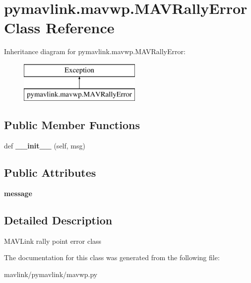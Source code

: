 \hypertarget{classpymavlink_1_1mavwp_1_1MAVRallyError}{}\section{pymavlink.\+mavwp.\+M\+A\+V\+Rally\+Error Class Reference}
\label{classpymavlink_1_1mavwp_1_1MAVRallyError}
Inheritance diagram for pymavlink.\+mavwp.\+M\+A\+V\+Rally\+Error\+:\begin{figure}[H]
\begin{center}
\leavevmode
\includegraphics[height=2.000000cm]{classpymavlink_1_1mavwp_1_1MAVRallyError}
\end{center}
\end{figure}
\subsection*{Public Member Functions}
\begin{DoxyCompactItemize}
\item 
\mbox{\label{classpymavlink_1_1mavwp_1_1MAVRallyError_ae934706d7f853e9a93e7ce5b9c6feba4}} 
def {\bfseries \+\_\+\+\_\+init\+\_\+\+\_\+} (self, msg)
\end{DoxyCompactItemize}
\subsection*{Public Attributes}
\begin{DoxyCompactItemize}
\item 
\mbox{\label{classpymavlink_1_1mavwp_1_1MAVRallyError_aa6a58e51c7b80f467341193dd32237d0}} 
{\bfseries message}
\end{DoxyCompactItemize}


\subsection{Detailed Description}
\begin{DoxyVerb}MAVLink rally point error class\end{DoxyVerb}
 

The documentation for this class was generated from the following file\+:\begin{DoxyCompactItemize}
\item 
mavlink/pymavlink/mavwp.\+py\end{DoxyCompactItemize}
